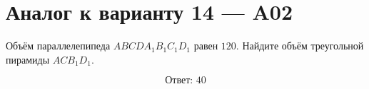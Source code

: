 \documentclass[12pt,a4paper]{article}
\begin{document}
\section*{Аналог к варианту 14 — A02}

Объём параллелепипеда \(ABCDA_1B_1C_1D_1\) равен \(120\). Найдите объём треугольной пирамиды \(ACB_1D_1\).

\begin{center}
\end{center}

\[
\boxed{\text{Ответ: }40}
\]
\end{document}
